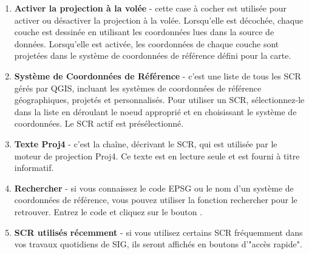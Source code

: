 \begin{enumerate}
\item \textbf{Activer la projection à la volée} -
cette case à cocher est utilisée pour activer ou désactiver la projection à la
volée. Lorsqu'elle est décochée, chaque couche est dessinée en utilisant les
coordonnées lues dans la source de données. Lorsqu'elle est activée, les
coordonnées de chaque couche sont projetées dans le système de coordonnées de
référence défini pour la carte.
\item \textbf{Système de Coordonnées de Référence} - c'est une liste de tous
les SCR gérés par QGIS, incluant les systèmes de coordonnées de référence 
géographiques, projetés et personnalisés. Pour utiliser un SCR, sélectionnez-le 
dans la liste en déroulant le noeud approprié et en choisissant le système de
coordonnées. Le SCR actif est présélectionné.
\item \textbf{Texte Proj4} - c'est la chaîne, décrivant le SCR, qui est utilisée 
par le moteur de projection Proj4. Ce texte est en lecture seule et est fourni 
à titre informatif.
\item \textbf{Rechercher} - si vous connaissez le code EPSG ou le nom d'un
système de coordonnées de référence, vous pouvez utiliser la fonction
rechercher pour le retrouver. Entrez le code et cliquez sur le bouton
.
\item \textbf{SCR utilisés récemment} - si vous utilisez certains SCR fréquemment 
dans vos travaux quotidiens de SIG, ils seront affichés en boutons d'"accès rapide".
\end{enumerate}

